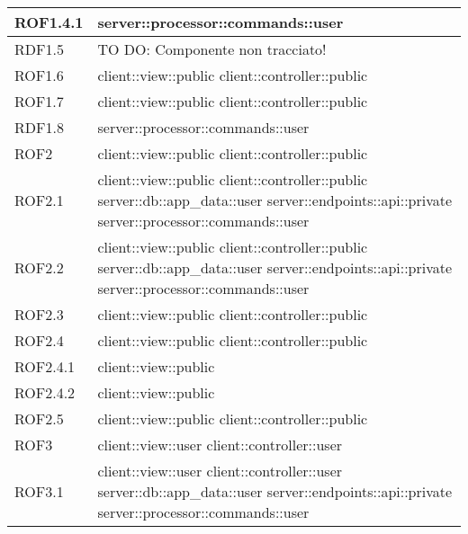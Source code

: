 \begin{center}
\begin{longtable}{| p{4cm} | p{8cm} |}
\hline
ROF1.4.1 & server::processor::commands::user \\
\hline
RDF1.5 & TO DO: Componente non tracciato! \\
\hline
ROF1.6 & client::view::public \newline client::controller::public \\
\hline
ROF1.7 & client::view::public \newline client::controller::public \\
\hline
RDF1.8 & server::processor::commands::user \\
\hline
ROF2 & client::view::public \newline client::controller::public \\
\hline
ROF2.1 & client::view::public \newline client::controller::public \newline server::db::app\_data::user \newline server::endpoints::api::private \newline server::processor::commands::user \\
\hline
ROF2.2 & client::view::public \newline client::controller::public \newline server::db::app\_data::user \newline server::endpoints::api::private \newline server::processor::commands::user \\
\hline
ROF2.3 & client::view::public \newline client::controller::public \\
\hline
ROF2.4 & client::view::public \newline client::controller::public \\
\hline
ROF2.4.1 & client::view::public \\
\hline
ROF2.4.2 & client::view::public \\
\hline
ROF2.5 & client::view::public \newline client::controller::public \\
\hline
ROF3 & client::view::user \newline client::controller::user \\
\hline
ROF3.1 & client::view::user \newline client::controller::user \newline server::db::app\_data::user \newline server::endpoints::api::private \newline server::processor::commands::user \\

\end{longtable}
\end{center}
